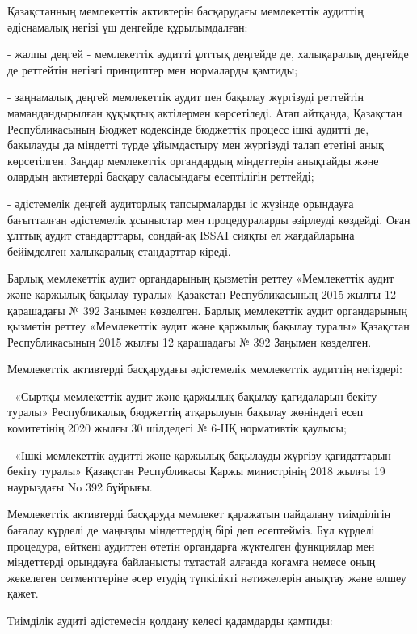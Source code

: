 \begin{multicols}{2}
Қазақстанның мемлекеттік активтерін басқарудағы мемлекеттік аудиттің
әдіснамалық негізі үш деңгейде құрылымдалған:

- жалпы деңгей - мемлекеттік аудитті ұлттық деңгейде де, халықаралық
деңгейде де реттейтін негізгі принциптер мен нормаларды қамтиды;

- заңнамалық деңгей мемлекеттік аудит пен бақылау жүргізуді реттейтін
мамандандырылған құқықтық актілермен көрсетіледі. Атап айтқанда,
Қазақстан Республикасының Бюджет кодексінде бюджеттік процесс ішкі
аудитті де, бақылауды да міндетті түрде ұйымдастыру мен жүргізуді талап
ететіні анық көрсетілген. Заңдар мемлекеттік органдардың міндеттерін
анықтайды және олардың активтерді басқару саласындағы есептілігін
реттейді;

- әдістемелік деңгей аудиторлық тапсырмаларды іс жүзінде орындауға
бағытталған әдістемелік ұсыныстар мен процедураларды әзірлеуді көздейді.
Оған ұлттық аудит стандарттары, сондай-ақ ISSAI сияқты ел жағдайларына
бейімделген халықаралық стандарттар кіреді.

Барлық мемлекеттік аудит органдарының қызметін реттеу «Мемлекеттік аудит
және қаржылық бақылау туралы» Қазақстан Республикасының 2015 жылғы 12
қарашадағы № 392 Заңымен көзделген. Барлық мемлекеттік аудит
органдарының қызметін реттеу «Мемлекеттік аудит және қаржылық бақылау
туралы» Қазақстан Республикасының 2015 жылғы 12 қарашадағы № 392 Заңымен
көзделген.

Мемлекеттік активтерді басқарудағы әдістемелік мемлекеттік аудиттің
негіздері:

- «Сыртқы мемлекеттік аудит және қаржылық бақылау қағидаларын бекіту
туралы» Республикалық бюджеттің атқарылуын бақылау жөніндегі есеп
комитетінің 2020 жылғы 30 шілдедегі № 6-НҚ нормативтік қаулысы;

- «Ішкі мемлекеттік аудитті және қаржылық бақылауды жүргізу қағидаттарын
бекіту туралы» Қазақстан Республикасы Қаржы министрінің 2018 жылғы 19
наурыздағы No 392 бұйрығы.

Мемлекеттік активтерді басқаруда мемлекет қаражатын пайдалану
тиімділігін бағалау күрделі де маңызды міндеттердің бірі деп есептейміз.
Бұл күрделі процедура, өйткені аудиттен өтетін органдарға жүктелген
функциялар мен міндеттерді орындауға байланысты тұтастай алғанда қоғамға
немесе оның жекелеген сегменттеріне әсер етудің түпкілікті нәтижелерін
анықтау және өлшеу қажет.

Тиімділік аудиті әдістемесін қолдану келесі қадамдарды қамтиды:


\end{multicols}
